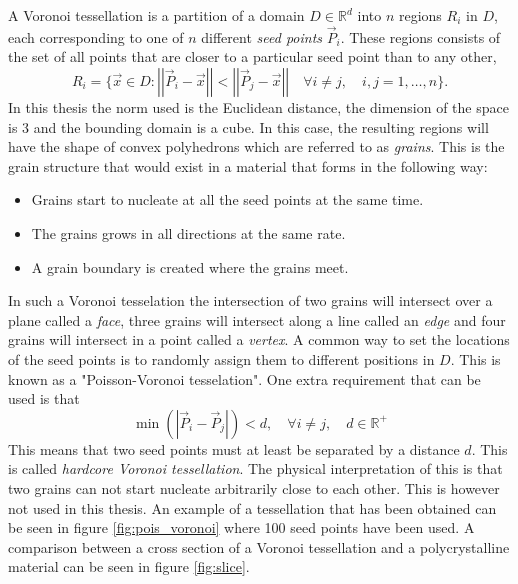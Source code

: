 \documentclass[micro_gen.tex]{subfiles}
\begin{document}
A Voronoi tessellation is a partition of a domain $D \in \mathbb{R}^d$ into $n$ regions $R_i$ in $D$, each corresponding to one of $n$ different \textit{seed points} $\vec{P}_i$. 
These regions consists of the set of all points that are closer to a particular seed point than to any other,
%
\[R_i = \{ \vec{x} \in D : \left|\left| \vec{P}_i - \vec{x} \right|\right| < \left|\left| \vec{P}_j - \vec{x} \right|\right| \quad  \forall i \neq j, \quad i,j = 1, \ldots, n \}. \]
%
In this thesis the norm used is the Euclidean distance, the dimension of the space is 3 and the bounding domain is a cube.
In this case, the resulting regions will have the shape of convex polyhedrons which are referred to as \textit{grains}. 
This is the grain structure that would exist in a material that forms in the following way:
\begin{itemize}
\item Grains start to nucleate at all the seed points at the same time.
\item The grains grows in all directions at the same rate.
\item A grain boundary is created where the grains meet.
\end{itemize}
In such a Voronoi tesselation the intersection of two grains will intersect over a plane called a \textit{face},
three grains will intersect along a line called an \textit{edge} and four grains will intersect in a point called a \textit{vertex}. A common way to set the locations of the seed points is to randomly assign them to different positions in $D$. This is known as a "Poisson-Voronoi tesselation". One extra requirement that can be used is that 
%
\[ \min \left( |\vec{P}_i - \vec{P}_j| \right) < d, \quad \forall i \neq j, \quad d \in \mathbb{R}^+ \]
%
This means that two seed points must at least be separated by a distance $d$. This is called \textit{hardcore Voronoi tessellation}. The physical interpretation of this is that two grains can not start nucleate arbitrarily close to each other. This is however not used in this thesis. An example of a tessellation that has been obtained can be seen in figure \ref{fig:pois_voronoi} where 100 seed points have been used. A comparison between a cross section of a Voronoi tessellation and a polycrystalline material can be seen in figure \ref{fig:slice}.
\end{document}
